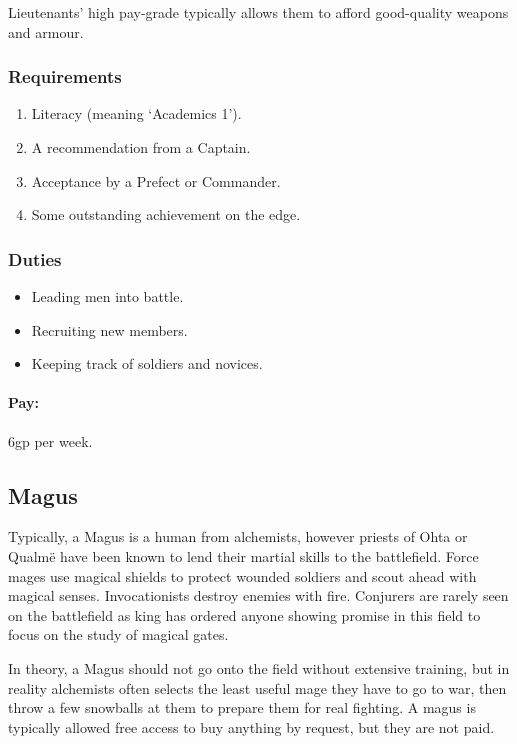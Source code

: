\begin{multicols}{2}
Lieutenants' high pay-grade typically allows them to afford good-quality weapons and armour.

\subsubsection{Requirements}

\begin{enumerate}
  \item
  Literacy (meaning `Academics 1').
  \item
  A recommendation from a Captain.
  \item
  Acceptance by a Prefect or Commander.
  \item
  Some outstanding achievement on the \gls{edge}.
\end{enumerate}

\subsubsection{Duties}

\begin{itemize}
  \item
  Leading men into battle.
  \item
  Recruiting new members.
  \item
  Keeping track of soldiers and novices.
\end{itemize}

\paragraph{Pay:} 6gp per week.

\subsection{Magus}

Typically, a Magus is a human from \gls{alchemists}, however priests of Ohta or Qualm\"e have been known to lend their martial skills to the battlefield.
Force mages use magical shields to protect wounded soldiers and scout ahead with magical senses.
Invocationists destroy enemies with fire.
Conjurers are rarely seen on the battlefield as \gls{king} has ordered anyone showing promise in this field to focus on the study of magical gates.

In theory, a Magus should not go onto the field without extensive training, but in reality \gls{alchemists} often selects the least useful mage they have to go to war, then throw a few snowballs at them to prepare them for real fighting.
A magus is typically allowed free access to buy anything by request, but they are not paid.


\end{multicols}
